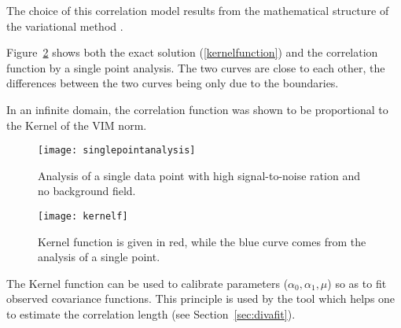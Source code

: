 %
%
%
%
%
%
%

The choice of this correlation model results from the mathematical structure of the variational method \citep{BRASSEUR96}.

Figure~\ref{kernel1} shows both the exact solution (\ref{kernelfunction}) and the correlation function by a single point analysis. The two curves are close to each other, the differences between the two curves being only due to the boundaries.

In an infinite domain, the correlation function was shown to be proportional to the Kernel of the VIM norm.

\begin{figure}[H]
\centering
\texttt{[image: singlepointanalysis]}
\caption{Analysis of a single data point with high signal-to-noise ration and no background field.\label{singleanalysis}}
\end{figure}

\begin{figure}[H]
\centering
\texttt{[image: kernelf]}
\caption{Kernel function is given in red, while the blue curve comes from the analysis of a single point.\label{kernel1}}
\end{figure}


The Kernel function can be used to calibrate \diva parameters ($\alpha_0, \alpha_1, \mu$) so as to fit observed covariance functions. This principle is used by the tool  which helps one to estimate the correlation length (see Section~\ref{sec:divafit}).

